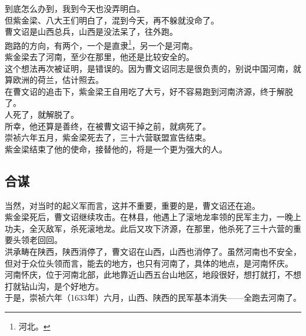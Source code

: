 \begin{multicols}{\theparacolNo}
到底怎么办到，我到今天也没弄明白。\\

但紫金梁、八大王们明白了，混到今天，再不躲就没命了。\\

曹文诏是山西总兵，山西是没法呆了，往外跑。\\

跑路的方向，有两个，一个是直隶\footnote{河北。}，另一个是河南。\\

紫金梁去了河南，至少在那里，他还是比较安全的。\\

这个想法再次被证明，是错误的。因为曹文诏同志是很负责的，别说中国河南，就算欧洲的荷兰，估计照去。\\

在曹文诏的追击下，紫金梁王自用吃了大亏，好不容易跑到河南济源，终于解脱了。\\

人死了，就解脱了。\\

所幸，他还算是善终，在被曹文诏干掉之前，就病死了。\\

崇祯六年五月，紫金梁死去了，三十六营联盟宣告结束。\\

紫金梁结束了他的使命，接替他的，将是一个更为强大的人。\\

\subsection{合谋}
当然，对当时的起义军而言，这并不重要，重要的是，曹文诏还在追。\\

紫金梁死后，曹文诏继续攻击。在林县，他遇上了滚地龙率领的民军主力，一晚上功夫，全灭敌军，杀死滚地龙。此后又攻下济源，在那里，他杀死了三十六营的重要头领老回回。\\

洪承畴在陕西，陕西消停了，曹文诏在山西，山西也消停了。虽然河南也不安全，但对于众位头领而言，能去的地方，也只有河南了，具体的地点，是河南怀庆。\\

河南怀庆，位于河南北部，此地靠近山西五台山地区，地段很好，想打就打，不想打就钻山沟，是个好地方。\\

于是，崇祯六年（1633年）六月，山西、陕西的民军基本消失——全跑去河南了。\\


\end{multicols}
